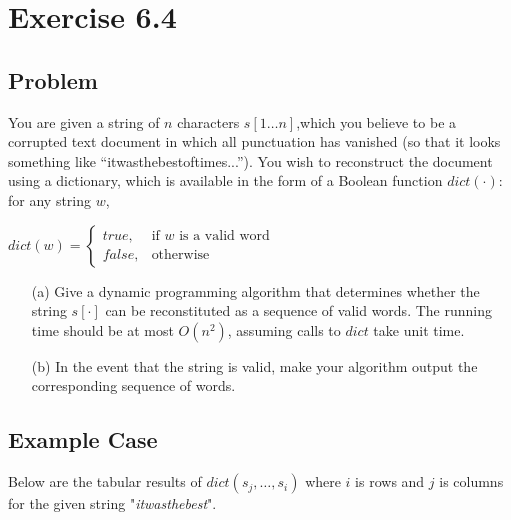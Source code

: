 \documentclass[12pt, letterpaper]{article}
\begin{document}
\section{Exercise 6.4}

\subsection{Problem}

You are given a string of \(n\) characters \(s[1 \dots n]\),which you believe to be a corrupted text document in which all punctuation has vanished (so that it looks something like “itwasthebestoftimes...”). You wish to reconstruct the document using a dictionary, which is available in the form of a Boolean function \(dict(\cdot)\): for any string \(w\),
\begin{center}
    \(
        dict(w) = 
        \begin{cases}
            true,& \text{if } w \text{ is a valid word} \\
            false,& \text{otherwise}
        \end{cases}
    \)
\end{center}

\begin{itemize}
    \item[(a)] Give a dynamic programming algorithm that determines whether the string \(s[\cdot]\) can be reconstituted as a sequence of valid words. The running time should be at most \(O(n^2)\), assuming calls to \(dict\) take unit time.
    \item[(b)] In the event that the string is valid, make your algorithm output the corresponding sequence of words.
\end{itemize}

\subsection{Example Case}

Below are the tabular results of \(dict(s_j,\dots,s_i)\) where \(i\) is rows and \(j\) is columns for the given string "\emph{itwasthebest}".
\end{document}
